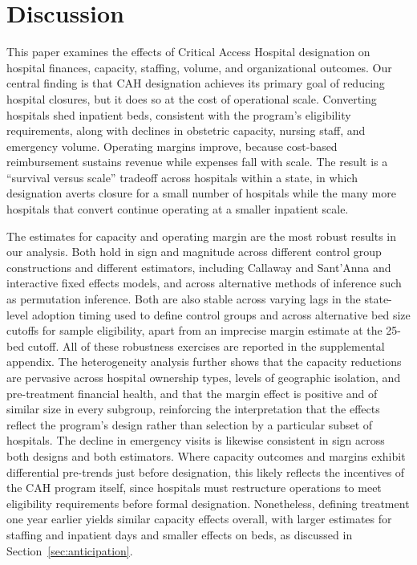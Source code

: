 \documentclass[a4paper, 12pt, twoside]{article}
\begin{document}
\section{Discussion}
\label{sec:conclusions}

This paper examines the effects of Critical Access Hospital designation on hospital finances, capacity, staffing, volume, and organizational outcomes. Our central finding is that CAH designation achieves its primary goal of reducing hospital closures, but it does so at the cost of operational scale. Converting hospitals shed inpatient beds, consistent with the program's eligibility requirements, along with declines in obstetric capacity, nursing staff, and emergency volume. Operating margins improve, because cost-based reimbursement sustains revenue while expenses fall with scale. The result is a ``survival versus scale'' tradeoff across hospitals within a state, in which designation averts closure for a small number of hospitals while the many more hospitals that convert continue operating at a smaller inpatient scale.

The estimates for capacity and operating margin are the most robust results in our analysis. Both hold in sign and magnitude across different control group constructions and different estimators, including Callaway and Sant'Anna and interactive fixed effects models, and across alternative methods of inference such as permutation inference. Both are also stable across varying lags in the state-level adoption timing used to define control groups and across alternative bed size cutoffs for sample eligibility, apart from an imprecise margin estimate at the 25-bed cutoff. All of these robustness exercises are reported in the supplemental appendix. The heterogeneity analysis further shows that the capacity reductions are pervasive across hospital ownership types, levels of geographic isolation, and pre-treatment financial health, and that the margin effect is positive and of similar size in every subgroup, reinforcing the interpretation that the effects reflect the program's design rather than selection by a particular subset of hospitals. The decline in emergency visits is likewise consistent in sign across both designs and both estimators. Where capacity outcomes and margins exhibit differential pre-trends just before designation, this likely reflects the incentives of the CAH program itself, since hospitals must restructure operations to meet eligibility requirements before formal designation. Nonetheless, defining treatment one year earlier yields similar capacity effects overall, with larger estimates for staffing and inpatient days and smaller effects on beds, as discussed in Section~\ref{sec:anticipation}.
\end{document}
